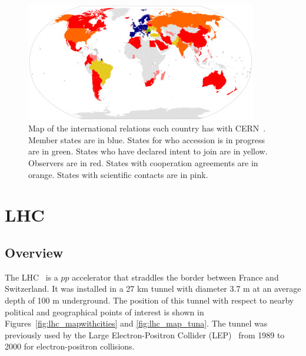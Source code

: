 \begin{figure}[ht]
 \begin{center}
    \includegraphics[width=0.90\textwidth]{figures/experiment/CERN_international_relations_map.pdf}
      \end{center}
\caption{Map of the international relations each country has with CERN~\cite{cern:map}.
Member states are in blue. States for who accession is in progress are in green.
States who have declared intent to join are in yellow. Observers are in red. States with
cooperation agreements are in orange. States with scientific contacts are in pink.
}
\label{fig:cernmembers}
\end{figure}


\section{LHC\label{sec:LHC}}
\subsection{Overview}
The LHC~\cite{cern-jinst-lhc} is a $pp$ accelerator that straddles the border between France and Switzerland. It was installed in a 27 km tunnel with diameter 3.7 m at an average depth of 100 m underground.
The position of this tunnel with respect to nearby political and geographical points of interest is 
shown in Figures~\ref{fig:lhc_mapwithcities} and \ref{fig:lhc_map_tuna}.
The tunnel was previously
used by the Large Electron-Positron Collider (LEP)~\cite{LEP_DR1979} from 1989 to 2000 for electron-positron collisions.

